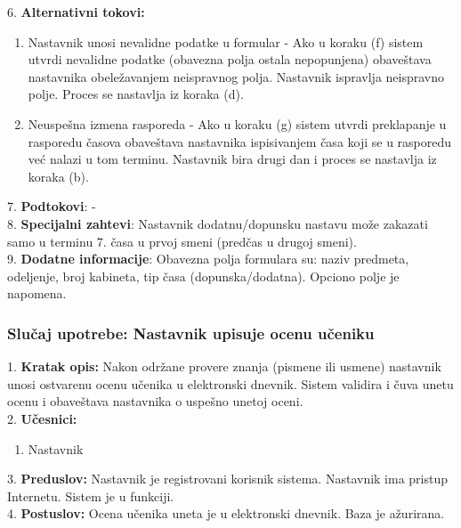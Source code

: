\documentclass{article}
\begin{document}
6. \textbf{Alternativni tokovi:}
\begin{enumerate} [label=(\roman*)]
\item Nastavnik unosi nevalidne podatke u formular - Ako u koraku (f) sistem utvrdi nevalidne podatke (obavezna polja ostala nepopunjena) obaveštava nastavnika obeležavanjem neispravnog polja. Nastavnik ispravlja neispravno polje. Proces se nastavlja iz koraka (d).
\item Neuspešna izmena rasporeda - Ako u koraku (g) sistem utvrdi preklapanje u rasporedu časova obaveštava nastavnika ispisivanjem časa koji se u rasporedu već nalazi u tom terminu. Nastavnik bira drugi dan i proces se nastavlja iz koraka (b).

\end{enumerate}

7. \textbf{Podtokovi}: - \\

8. \textbf{Specijalni zahtevi}: Nastavnik dodatnu/dopunsku nastavu može zakazati samo u terminu 7. časa u prvoj smeni (predčas u drugoj smeni). \\

9. \textbf{Dodatne informacije}: Obavezna polja formulara su: naziv predmeta, odeljenje, broj kabineta, tip časa (dopunska/dodatna). Opciono polje je napomena. \\


\subsubsection{Slučaj upotrebe: Nastavnik upisuje ocenu učeniku} 
1. \textbf{Kratak opis:} Nakon održane provere znanja (pismene ili usmene) nastavnik unosi ostvarenu ocenu učenika u elektronski dnevnik. Sistem validira i čuva unetu ocenu i obaveštava nastavnika o uspešno unetoj oceni.  \\

2. \textbf{Učesnici:}
\begin{enumerate} [label=(\alph*)]
\item Nastavnik
\end{enumerate} 

3. \textbf{Preduslov:} Nastavnik je registrovani korisnik sistema. Nastavnik ima pristup Internetu. Sistem je u funkciji. \\

4. \textbf{Postuslov:} Ocena učenika uneta je u elektronski dnevnik. Baza je ažurirana.\\
\end{document}
